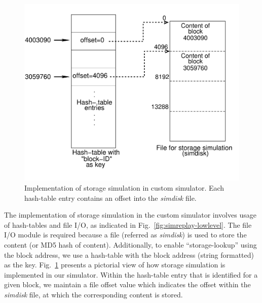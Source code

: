 \begin{figure}[t]
    \centering
    \includegraphics[scale=0.6]{simreplaychap-figures/simreplay-simdisk.pdf}
    \caption{Implementation of storage simulation in custom simulator. Each 
			hash-table entry contains an offset into the 
			\textit{simdisk} file.}
    \label{fig:simreplay-simdisk}
\end{figure}

The implementation of storage simulation in the custom simulator involves
usage of hash-tables and file I/O, as indicated in 
Fig.~\ref{fig:simreplay-lowlevel}. The file I/O module is required
because a file (referred as \textit{simdisk}) 
is used to store the content (or MD5 hash of content). 
Additionally, to enable ``storage-lookup'' using the block address,
we use a hash-table with the block address (string formatted) as the key.
Fig.~\ref{fig:simreplay-simdisk} presents a pictorial view of 
how storage simulation is implemented in our simulator.
Within the hash-table entry that is identified for a given block, we 
maintain a file offset value which indicates the offset within the 
\textit{simdisk} file, at which the corresponding content is stored.

